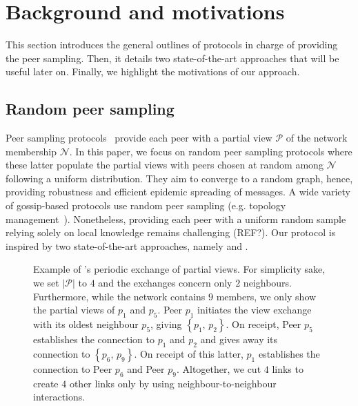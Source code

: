 
\section{Background and motivations}
\label{sec:background}

This section introduces the general outlines of protocols in charge of
providing the peer sampling. Then, it details two state-of-the-art
approaches that will be useful later on. Finally, we highlight the motivations
of our approach.

\subsection{Random peer sampling}
Peer sampling protocols~\cite{jelasity2004peer} provide each peer with a
partial view $\mathcal{P}$ of the network membership $\mathcal{N}$. In this
paper, we focus on random peer sampling protocols where these latter populate
the partial views with peers chosen at random among $\mathcal{N}$ following a
uniform distribution. They aim to converge to a random graph, hence, providing
robustness and efficient epidemic spreading of messages. A wide variety of
gossip-based protocols use random peer sampling (e.g. topology
management~\cite{voulgaris2005epidemic,jelasity2009tman}). Nonetheless,
providing each peer with a uniform random sample relying solely on local
knowledge remains challenging (REF?).  Our \SCAMPLON{} protocol is inspired by
two state-of-the-art approaches, namely \SCAMP{} and \CYCLON{}.


\begin{figure}
  \centering
  
  \caption{\label{fig:cyclonexample}Example of \CYCLON{}'s periodic exchange of
    partial views. For simplicity sake, we set $|\mathcal{P}|$ to $4$ and the
    exchanges concern only $2$ neighbours. Furthermore, while the network
    contains $9$ members, we only show the partial views of $p_1$ and $p_5$.
    Peer $p_1$ initiates the view exchange with its oldest neighbour $p_5$,
    giving $\left\{p_1,\,p_2\right\}$. On receipt, Peer $p_5$ establishes the
    connection to $p_1$ and $p_2$ and gives away its connection to
    $\left\{p_6,\,p_9\right\}$.  On receipt of this latter, $p_1$ establishes
    the connection to Peer $p_6$ and Peer $p_9$. Altogether, we cut $4$ links
    to create $4$ other links only by using neighbour-to-neighbour
    interactions.}
\end{figure}

